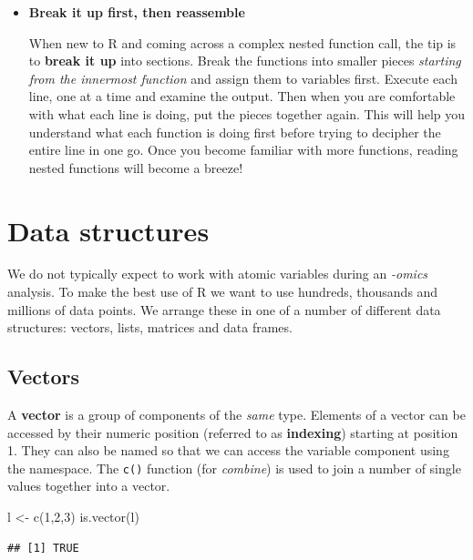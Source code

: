 \documentclass[a4paper]{book}
\newenvironment{Shaded}{}{}
\newcommand{\KeywordTok}[1]{\textcolor[rgb]{0.00,0.00,1.00}{{#1}}}
\newcommand{\DecValTok}[1]{{#1}}
\newcommand{\StringTok}[1]{\textcolor[rgb]{0.00,0.50,0.50}{{#1}}}
\newcommand{\NormalTok}[1]{{#1}}
\newlength{\leftbarwidth}
\newlength{\leftbarsep}
\newcommand*{\leftbarcolorcmd}{\color{darkgray}}%
\renewenvironment{leftbar}{%
    \def\FrameCommand{{\leftbarcolorcmd{\vrule width \leftbarwidth\relax\hspace {\leftbarsep}}}}%
    \MakeFramed {\advance \hsize -\width \FrameRestore }%
}{%
    \endMakeFramed
}
\renewenvironment{Shaded}
{\vspace{0em}\begin{leftbar}\begin{snugshade}}
{\end{snugshade}\end{leftbar}\vspace{0pt}}
\newenvironment{rmdblock}[1]
  {\vspace{1.5em}\begin{shaded*}
  \begin{itemize}
  \renewcommand{\labelitemi}{
    \raisebox{-.7\height}[0pt][0pt]{
      {\setkeys{Gin}{width=3em,keepaspectratio}\texttt{[image: images/\#1]}}
    }
  }
  \item
  }
  {
  \end{itemize}
  \end{shaded*}
  }
\newenvironment{rmdtip}
  {\begin{rmdblock}{tip}}
  {\end{rmdblock}}
\begin{document}
\begin{rmdtip}
\textbf{Break it up first, then reassemble}

When new to R and coming across a complex nested function call, the tip
is to \textbf{break it up} into sections. Break the functions into
smaller pieces \emph{starting from the innermost function} and assign
them to variables first. Execute each line, one at a time and examine
the output. Then when you are comfortable with what each line is doing,
put the pieces together again. This will help you understand what each
function is doing first before trying to decipher the entire line in one
go. Once you become familiar with more functions, reading nested
functions will become a breeze!
\end{rmdtip}

\section{Data structures}\label{data-structures}

We do not typically expect to work with atomic variables during an
\emph{-omics} analysis. To make the best use of R we want to use
hundreds, thousands and millions of data points. We arrange these in one
of a number of different data structures: vectors, lists, matrices and
data frames.

\subsection{Vectors}\label{vectors}

A \textbf{vector} is a group of components of the \emph{same} type.
Elements of a vector can be accessed by their numeric position (referred
to as \textbf{indexing}) starting at position 1. They can also be named
so that we can access the variable component using the namespace. The
\texttt{c()} function (for \emph{combine}) is used to join a number of
single values together into a vector.

\begin{Shaded}
\begin{Highlighting}[]
\NormalTok{l <-}\StringTok{ }\KeywordTok{c}\NormalTok{(}\DecValTok{1}\NormalTok{,}\DecValTok{2}\NormalTok{,}\DecValTok{3}\NormalTok{)}
\KeywordTok{is.vector}\NormalTok{(l)}
\end{Highlighting}
\end{Shaded}

\begin{verbatim}
## [1] TRUE
\end{verbatim}
\end{document}
